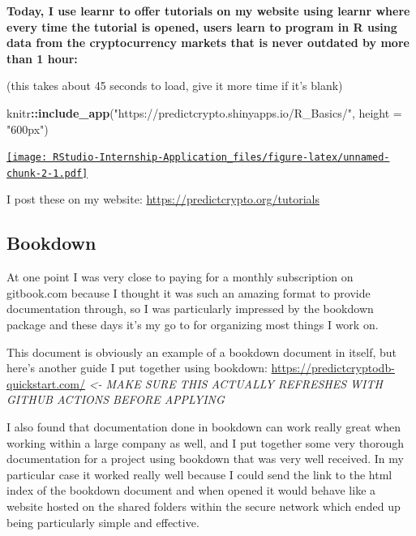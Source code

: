 \documentclass[
]{book}
\newenvironment{Shaded}{\begin{snugshade}}{\end{snugshade}}
\newcommand{\DataTypeTok}[1]{\textcolor[rgb]{0.13,0.29,0.53}{#1}}
\newcommand{\KeywordTok}[1]{\textcolor[rgb]{0.13,0.29,0.53}{\textbf{#1}}}
\newcommand{\NormalTok}[1]{#1}
\newcommand{\OperatorTok}[1]{\textcolor[rgb]{0.81,0.36,0.00}{\textbf{#1}}}
\newcommand{\StringTok}[1]{\textcolor[rgb]{0.31,0.60,0.02}{#1}}
\begin{document}
\textbf{Today, I use learnr to offer tutorials on my website using learnr where every time the tutorial is opened, users learn to program in R using data from the cryptocurrency markets that is never outdated by more than 1 hour:}

(this takes about 45 seconds to load, give it more time if it's blank)

\begin{Shaded}
\begin{Highlighting}[]
\NormalTok{knitr}\OperatorTok{::}\KeywordTok{include_app}\NormalTok{(}\StringTok{"https://predictcrypto.shinyapps.io/R_Basics/"}\NormalTok{, }
  \DataTypeTok{height =} \StringTok{"600px"}\NormalTok{)}
\end{Highlighting}
\end{Shaded}

\href{https://predictcrypto.shinyapps.io/R_Basics/}{\texttt{[image: RStudio-Internship-Application\_files/figure-latex/unnamed-chunk-2-1.pdf]}}

I post these on my website: \url{https://predictcrypto.org/tutorials}

\hypertarget{bookdown}{%
\subsection{Bookdown}\label{bookdown}}

At one point I was very close to paying for a monthly subscription on gitbook.com because I thought it was such an amazing format to provide documentation through, so I was particularly impressed by the bookdown \citep{R-bookdown} package and these days it's my go to for organizing most things I work on.

This document is obviously an example of a bookdown document in itself, but here's another guide I put together using bookdown: \url{https://predictcryptodb-quickstart.com/} \emph{\textless- MAKE SURE THIS ACTUALLY REFRESHES WITH GITHUB ACTIONS BEFORE APPLYING}

I also found that documentation done in bookdown can work really great when working within a large company as well, and I put together some very thorough documentation for a project using bookdown that was very well received. In my particular case it worked really well because I could send the link to the html index of the bookdown document and when opened it would behave like a website hosted on the shared folders within the secure network which ended up being particularly simple and effective.
\end{document}
